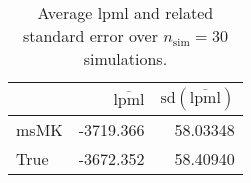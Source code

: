 \begin{table}[H]

\caption{Average lpml and related standard error over $n_{\text{sim}} = 30$ simulations.}
\centering
\begin{tabular}[t]{lrr}
\toprule
  & $\overbar{\text{lpml}}$ & $\text{sd}(\overbar{\text{lpml}})$\\
\midrule
msMK & -3719.366 & 58.03348\\
True & -3672.352 & 58.40940\\
\bottomrule
\end{tabular}
\end{table}
